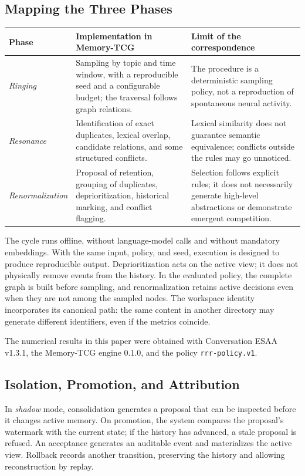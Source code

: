 \documentclass[11pt,a4paper]{article}
\begin{document}
\subsection{Mapping the Three Phases}\label{sec:3.2}
\begin{center}
\begin{tabular}{>{\raggedright\arraybackslash}p{2.9cm}>{\raggedright\arraybackslash}p{5.6cm}>{\raggedright\arraybackslash}p{5.9cm}}
\toprule
\textbf{Phase} & \textbf{Implementation in Memory-TCG} & \textbf{Limit of the correspondence} \\
\midrule
\emph{Ringing} & Sampling by topic and time window, with a reproducible seed and a configurable budget; the traversal follows graph relations. & The procedure is a deterministic sampling policy, not a reproduction of spontaneous neural activity. \\[2pt]
\emph{Resonance} & Identification of exact duplicates, lexical overlap, candidate relations, and some structured conflicts. & Lexical similarity does not guarantee semantic equivalence; conflicts outside the rules may go unnoticed. \\[2pt]
\emph{Renormalization} & Proposal of retention, grouping of duplicates, deprioritization, historical marking, and conflict flagging. & Selection follows explicit rules; it does not necessarily generate high-level abstractions or demonstrate emergent competition. \\[2pt]
\bottomrule
\end{tabular}
\end{center}
The cycle runs offline, without language-model calls and without mandatory embeddings. With the same input, policy, and seed, execution is designed to produce reproducible output. Deprioritization acts on the active view; it does not physically remove events from the history. In the evaluated policy, the complete graph is built before sampling, and renormalization retains active decisions even when they are not among the sampled nodes. The workspace identity incorporates its canonical path: the same content in another directory may generate different identifiers, even if the metrics coincide.

The numerical results in this paper were obtained with Conversation ESAA v1.3.1, the Memory-TCG engine 0.1.0, and the policy \texttt{rrr-\allowbreak{}policy.\allowbreak{}v1}.

\subsection{Isolation, Promotion, and Attribution}\label{sec:3.3}
In \emph{shadow} mode, consolidation generates a proposal that can be inspected before it changes active memory. On promotion, the system compares the proposal's watermark with the current state; if the history has advanced, a stale proposal is refused. An acceptance generates an auditable event and materializes the active view. Rollback records another transition, preserving the history and allowing reconstruction by replay.
\end{document}
